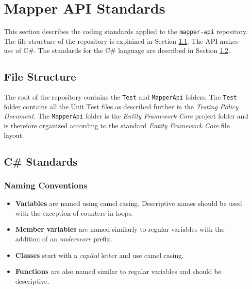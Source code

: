 \documentclass{article}
\begin{document}

    \section{Mapper API Standards}
    \label{sec:mapper-api}

    This section describes the coding standards applied to the
    \texttt{mapper-api} repository.%
    The file structure of the
    repository is explained in Section \ref{sec:api-struc}. The API makes use of
    C\#. The standards for the C\# language are described in Section
    \ref{sec:cs}.



    \subsection{File Structure}
    \label{sec:api-struc}

    The root of the repository contains the \texttt{Test} and \texttt{MapperApi}
    folders. The \texttt{Test} folder contains all the Unit Test files as
    described further in the \textit{Testing Policy Document}. The
    \texttt{MapperApi} folder is the \textit{Entity Framework Core} project
    folder and is therefore organized according to the standard \textit{Entity
    Framework Core} file layout.

    \subsection{C\# Standards}
    \label{sec:cs}

    \subsubsection{Naming Conventions}
    \label{sec:cs-nc}

    \begin{itemize}
        \item \textbf{Variables} are named using camel casing. Descriptive names
                should be used with the exception of counters in loops.
        \item \textbf{Member variables} are named similarly to regular variables
                with the addition of an \textit{underscore} prefix.
        \item \textbf{Classes} start with a \textit{capital} letter and use
                camel casing.
        \item \textbf{Functions} are also named similar to regular variables and
                should be descriptive.
    \end{itemize}
\end{document}
